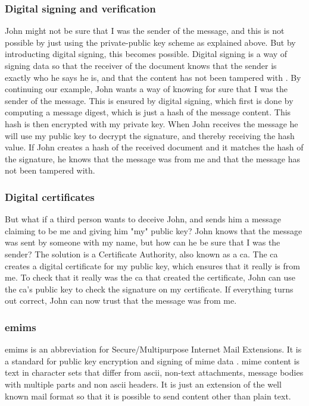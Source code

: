 \subsubsection{Digital signing and verification}
John might not be sure that I was the sender of the message, and this is not possible by just using the private-public key scheme as explained above. But by introducting digital signing, this becomes possible. Digital signing is a way of signing data so that the receiver of the document knows that the sender is exactly who he says he is, and that the content has not been tampered with \cite{bib:ds}. By continuing our example, John wants a way of knowing for sure that I was the sender of the message. This is ensured by digital signing, which first is done by computing a message digest, which is just a hash of the message content. This hash is then encrypted with my private key. When John receives the message he will use my public key to decrypt the signature, and thereby receiving the hash value. If John creates a hash of the received document and it matches the hash of the signature, he knows that the message was from me and that the message has not been tampered with. 

\subsubsection{Digital certificates}
But what if a third person wants to deceive John, and sends him a message claiming to be me and giving him "my" public key? John knows that the message was sent by someone with my name, but how can he be sure that I was the sender? The solution is a Certificate Authority, also known as a \gls{ca}. The \gls{ca} creates a digital certificate for my public key, which ensures that it really is from me. To check that it really was the \gls{ca} that created the certificate, John can use the \gls{ca}'s public key to check the signature on my certificate. If everything turns out correct, John can now trust that the message was from me.

\subsubsection{\gls{emims}}
\gls{emims} is an abbreviation for Secure/Multipurpose Internet Mail Extensions. It is a standard for public key encryption and signing of \gls{mime} data \cite{bib:smime}. \gls{mime} content is text in character sets that differ from \gls{ascii}, non-text attachments, message bodies with multiple parts and non \gls{ascii} headers. It is just an extension of the well known mail format so that it is possible to send content other than plain text.

